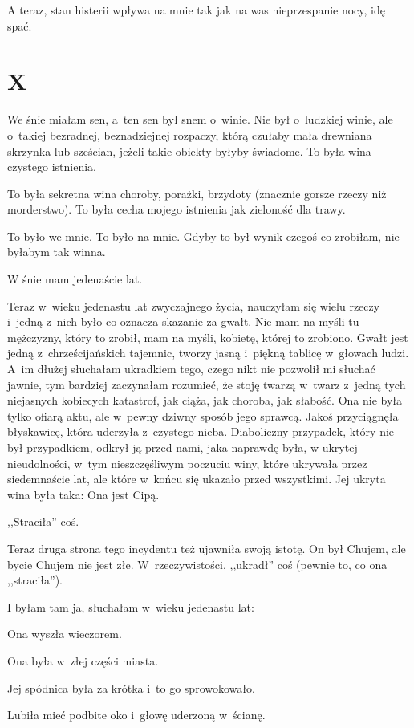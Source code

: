 \documentclass[oneside,polish,12pt,sfheadings]{mwbk}
\begin{document}
A teraz, stan histerii wpływa na mnie tak jak na was nieprzespanie
nocy, idę spać.

\chapter{X}

We śnie miałam sen, a~ten sen był snem o~winie. Nie był o~ludzkiej
winie, ale o~takiej bezradnej, beznadziejnej rozpaczy, którą czułaby
mała drewniana skrzynka lub sześcian, jeżeli takie obiekty byłyby
świadome. To była wina czystego istnienia.

To była sekretna wina choroby, porażki, brzydoty (znacznie gorsze
rzeczy niż morderstwo). To była cecha mojego istnienia jak zieloność
dla trawy.

To było we mnie. To było na mnie. Gdyby to był wynik czegoś co zrobiłam,
nie byłabym tak winna.

W śnie mam jedenaście lat.

Teraz w~wieku jedenastu lat zwyczajnego życia, nauczyłam się wielu
rzeczy i~jedną z~nich było co oznacza skazanie za gwałt. Nie mam na
myśli tu mężczyzny, który to zrobił, mam na myśli, kobietę, której
to zrobiono. Gwałt jest jedną z~chrześcijańskich tajemnic, tworzy
jasną i~piękną tablicę w~głowach ludzi. A~im dłużej słuchałam ukradkiem
tego, czego nikt nie pozwolił mi słuchać jawnie, tym bardziej zaczynałam
rozumieć, że stoję twarzą w~twarz z~jedną tych niejasnych kobiecych
katastrof, jak ciąża, jak choroba, jak słabość. Ona nie była tylko
ofiarą aktu, ale w~pewny dziwny sposób jego sprawcą. Jakoś przyciągnęła
błyskawicę, która uderzyła z~czystego nieba. Diaboliczny przypadek,
który nie był przypadkiem, odkrył ją przed nami, jaka naprawdę była,
w ukrytej nieudolności, w~tym nieszczęśliwym poczuciu winy, które
ukrywała przez siedemnaście lat, ale które w~końcu się ukazało przed
wszystkimi. Jej ukryta wina była taka: Ona jest Cipą.

,,Straciła'' coś.

Teraz druga strona tego incydentu też ujawniła swoją istotę. On był
Chujem, ale bycie Chujem nie jest złe. W~rzeczywistości, ,,ukradł''
coś (pewnie to, co ona ,,straciła'').

I byłam tam ja, słuchałam w~wieku jedenastu lat: 

Ona wyszła wieczorem.

Ona była w~złej części miasta.

Jej spódnica była za krótka i~to go sprowokowało.

Lubiła mieć podbite oko i~głowę uderzoną w~ścianę.
\end{document}

